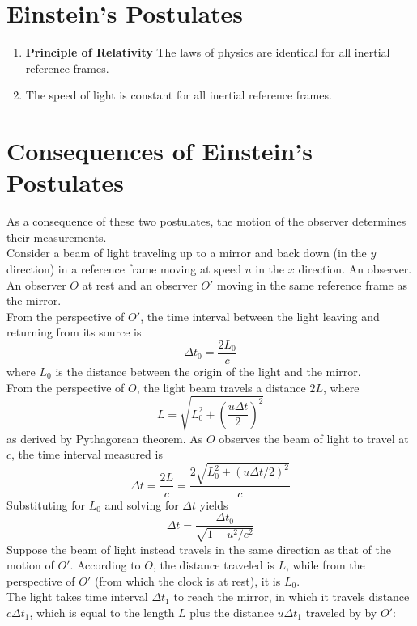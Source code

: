\documentclass{subfiles}
\begin{document}
	\section{Einstein's Postulates}
		\begin{enumerate}
			\item \textbf{Principle of Relativity} 
				The laws of physics are identical for all inertial reference frames.
			\item 
				The speed of light is constant for all inertial reference frames.
		\end{enumerate}
	\section{Consequences of Einstein's Postulates}
		As a consequence of these two postulates, the motion of the observer determines their measurements. \\
			Consider a beam of light traveling up to a mirror and back down (in the \(y\) direction) in a reference frame moving at speed \(u\) in the \(x\) direction. An observer. An observer \(O\) at rest and an observer \(O'\) moving in the same reference frame as the mirror. \\
				From the perspective of \(O'\), the time interval between the light leaving and returning from its source is
				\[\Delta t_0 = \frac{2L_0}{c}\]
				where \(L_0\) is the distance between the origin of the light and the mirror. \\
				From the perspective of \(O\), the light beam travels a distance \(2L\), where
				\[L = \sqrt{L_0^2 + \left(\frac{u\Delta t}{2}\right)^2}\]
				as derived by Pythagorean theorem. As \(O\) observes the beam of light to travel at \(c\), the time interval measured is
				\[
					\Delta t = \frac{2L}{c} 
						= \frac{2\sqrt{L_0^2 + (u\Delta t/2)^2}}{c}
				\]
				Substituting for \(L_0\) and solving for \(\Delta t\) yields
				\[\Delta t = \frac{\Delta t_0}{\sqrt{1 - u^2/c^2}} \tag{time dilation}\]
			Suppose the beam of light instead travels in the same direction as that of the motion of \(O'\). According to \(O\), the distance traveled is \(L\), while from the perspective of \(O'\) (from which the clock is at rest), it is \(L_0\). \\
				The light takes time interval \(\Delta t_1\) to reach the mirror, in which it travels distance \(c\Delta t_1\), which is equal to the length \(L\) plus the distance \(u\Delta t_1\) traveled by by \(O'\):
\end{document}
